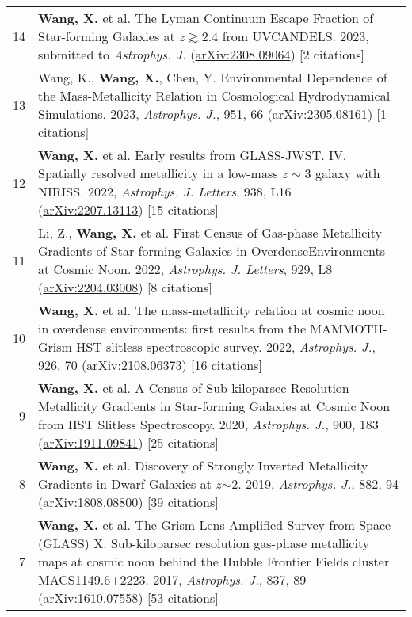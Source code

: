 \documentclass[letterpaper,10pt]{article}
\begin{document}
\begin{longtable}{rp{6.3in}}
14 &  \textbf{Wang, X.} et al. The Lyman Continuum Escape Fraction of Star-forming Galaxies at $z\gtrsim2.4$ from UVCANDELS. 2023, submitted to \textit{Astrophys. J.} (\href{https://arxiv.org/abs/2308.09064}{arXiv:2308.09064}) [2 citations] \\

13 &  Wang, K., \textbf{Wang, X.}, Chen, Y. Environmental Dependence of the Mass-Metallicity Relation in Cosmological Hydrodynamical Simulations. 2023, \textit{Astrophys. J.}, 951, 66 (\href{https://arxiv.org/abs/2305.08161}{arXiv:2305.08161}) [1 citations]    \\

12 &  \textbf{Wang, X.} et al. Early results from GLASS-JWST. IV. Spatially resolved metallicity in a low-mass $z\sim3$ galaxy with NIRISS. 2022, \textit{Astrophys. J. Letters}, 938, L16 (\href{https://arxiv.org/abs/2207.13113}{arXiv:2207.13113}) [15 citations] \\

11 &  Li, Z., \textbf{Wang, X.} et al. First Census of Gas-phase Metallicity Gradients of Star-forming Galaxies in OverdenseEnvironments at Cosmic Noon. 2022, \textit{Astrophys. J. Letters}, 929, L8 (\href{https://arxiv.org/abs/2204.03008}{arXiv:2204.03008}) [8 citations] \\

10 &  \textbf{Wang, X.} et al. The mass-metallicity relation at cosmic noon in overdense environments: first results from the MAMMOTH-Grism HST slitless spectroscopic survey. 2022, \textit{Astrophys. J.}, 926, 70 (\href{https://arxiv.org/abs/2108.06373}{arXiv:2108.06373}) [16 citations] \\

9 &  \textbf{Wang, X.} et al. A Census of Sub-kiloparsec Resolution Metallicity Gradients in Star-forming Galaxies at Cosmic Noon from HST Slitless Spectroscopy. 2020, \textit{Astrophys. J.}, 900, 183 (\href{https://arxiv.org/abs/1911.09841}{arXiv:1911.09841}) [25 citations] \\

8 &  \textbf{Wang, X.} et al. Discovery of Strongly Inverted Metallicity Gradients in Dwarf Galaxies at $z$$\sim$2. 2019, \textit{Astrophys. J.}, 882, 94 (\href{https://arxiv.org/abs/1808.08800}{arXiv:1808.08800}) [39 citations]  \\

7 &  \textbf{Wang, X.} et al. The Grism Lens-Amplified Survey from Space (GLASS) X. Sub-kiloparsec resolution gas-phase metallicity maps at cosmic noon behind the Hubble Frontier Fields cluster MACS1149.6+2223. 2017, \textit{Astrophys. J.}, 837, 89 (\href{http://arxiv.org/abs/1610.07558} {arXiv:1610.07558}) [53 citations]    \\


\end{longtable}
\end{document}
